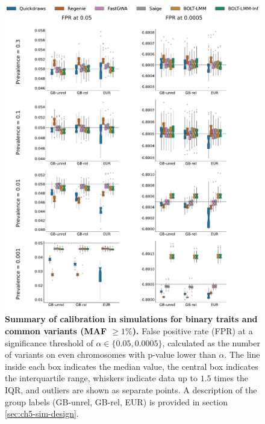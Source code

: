 \begin{figure}[h!]
    \centering
    \includegraphics[width=\textwidth]{figures/sim_calibration/bt_fpr_common.pdf}
    \caption{\textbf{Summary of calibration in simulations for binary traits and common variants (MAF $\geq 1\%$).}
    False positive rate (FPR) at a significance threshold of $\alpha \in \{0.05, 0.0005\}$, calculated as the number of variants on even chromosomes with p-value lower than $\alpha$.
    The line inside each box indicates the median value, the central box indicates the interquartile range, whiskers indicate data up to $1.5$ times the IQR, and outliers are shown as separate points.
    A description of the group labels (GB-unrel, GB-rel, EUR) is provided in section \ref{sec:ch5-sim-design}.
    \label{fig:qd_sim_fpr_bt1}
    }
\end{figure}

